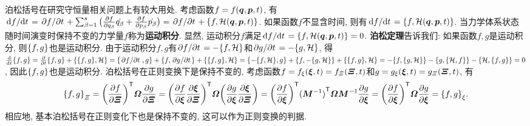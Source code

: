 泊松括号在研究守恒量相关问题上有较大用处. 考虑函数$ f=f(\vb*{q},\vb*{p},t) $, 有$ \dv*{f}{t} = \pdv*{f}{t}+\sum_{\beta=1}^s \big(\pdv{f}{q_{\beta}}\dot{q_{\beta}}+\pdv{f}{p_{\beta}}\dot{p_{\beta}}\big) = \pdv*{f}{t}+\pb{f}{\hami(\vb*{q},\vb*{p},t)} $. 如果函数$ f $不显含时间, 则有$ \dv*{f}{t} = \pb{f}{\hami(\vb*{q},\vb*{p},t)} $. 当力学体系状态随时间演变时保持不变的力学量$ f $称为\textbf{运动积分}. 显然, 运动积分$ f $满足$ \dv*{f}{t}=\pb{f}{\hami(\vb*{q},\vb*{p},t)}=0 $. \textbf{泊松定理}告诉我们: 如果函数$ f,g $是运动积分, 则$ \pb{f}{g} $也是运动积分. 由于运动积分$ f,g $有$ \pdv*{f}{t}=-\pb{f}{\hami} $和$ \pdv*{g}{t}=-\pb{g}{\hami} $, 得$ \dv{t} \pb{f}{g} = \pdv{t} \pb{f}{g}+\pb{\pb{f}{g}}{\hami} = \pb{\pdv*{f}{t}}{g}+\pb{f}{\pdv*{g}{t}}+\pb{\pb{f}{g}}{\hami} = \pb{-\pb{f}{\hami}}{g}+\pb{f}{-\pb{g}{\hami}}+\pb{\pb{f}{g}}{\hami} = -\pb{f}{\pb{g}{\hami}}-\pb{g}{\pb{\hami}{f}}-\pb{\hami}{\pb{f}{g}} = 0 $, 因此$ \pb{f}{g} $也是运动积分. 泊松括号在正则变换下是保持不变的, 考虑函数$ f=f_{\xi}(\vb*{\xi},t)=f_{\varXi}(\vb*{\varXi},t) $和$ g=g_{\xi}(\vb*{\xi},t)=g_{\varXi}(\vb*{\varXi},t) $, 有
\begin{equation*}
    \pb{f}{g}_{\varXi} = \transpose{\bigg(\pdv{f}{\vb*{\varXi}}\bigg)} \vb*{\varOmega} \pdv{g}{\vb*{\varXi}} = \transpose{\bigg(\pdv{f}{\vb*{\xi}}\pdv{\vb*{\xi}}{\vb*{\varXi}}\bigg)} \vb*{\varOmega} \bigg(\pdv{g}{\vb*{\xi}}\pdv{\vb*{\xi}}{\vb*{\varXi}}\bigg) = \transpose{\bigg(\pdv{f}{\vb*{\xi}}\bigg)} \transpose{(\vb*{M}^{-1})} \vb*{\varOmega}\vb*{M}^{-1} \pdv{g}{\vb*{\xi}} = \transpose{\bigg(\pdv{f}{\vb*{\xi}}\bigg)} \vb*{\varOmega} \pdv{g}{\vb*{\xi}} = \pb{f}{g}_{\xi}.
\end{equation*}
相应地, 基本泊松括号在正则变化下也是保持不变的, 这可以作为正则变换的判据.

